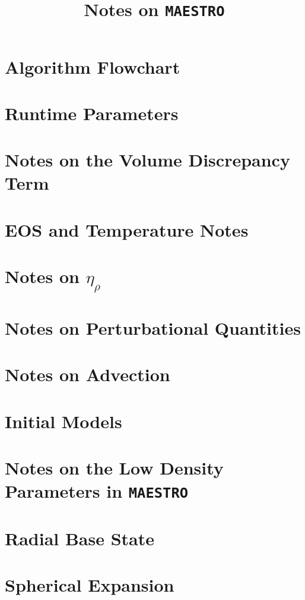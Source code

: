 \documentclass[11pt]{book}
\title{Notes on {\tt MAESTRO}}
\newcommand{\etarho}{\eta_{\rho}}
\begin{document}
\maketitle
\tableofcontents
\cleardoublepage

\chapter{Algorithm Flowchart}


\chapter{Runtime Parameters}


\chapter{Notes on the Volume Discrepancy Term}


\chapter{EOS and Temperature Notes}


\chapter{Notes on $\etarho$}


\chapter{Notes on Perturbational Quantities}


\chapter{Notes on Advection}


\chapter{Initial Models}


\chapter{Notes on the Low Density Parameters in {\tt MAESTRO}}


\chapter{Radial Base State}


\chapter{Spherical Expansion}

\end{document}
